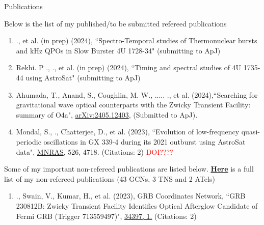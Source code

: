 \begin{section}{Publications}

    Below is the list of my published/to be submitted refereed publications
    \vspace{1em}

    \begin{enumerate}
        \item \me., et al. (in prep) (2024), {``Spectro-Temporal studies of Thermonuclear bursts and kHz QPOs in Slow Burster 4U 1728-34"} (submitting to ApJ)
        \vspace{-0.2em}

        \item Rekhi. P ., \me., et al. (in prep) (2024), {``Timing and spectral studies of 4U 1735-44 using AstroSat"} (submitting to ApJ)
        \vspace{-0.2em}

        \item Ahumada, T., Anand, S., Coughlin, M. W., ..... \me ., et al. (2024),{``Searching for gravitational wave optical counterparts with the Zwicky Transient Facility: summary of O4a"}, \href{https://arxiv.org/pdf/2405.12403}{arXiv:2405.12403}, (Submitted to ApJ).
        \vspace{-0.2em}

        \item Mondal, S., \me.,  Chatterjee, D., et al. (2023), {``Evolution of low-frequency quasi-periodic oscillations in GX 339-4 during its 2021 outburst using AstroSat data"}, \href{https://ui.adsabs.harvard.edu/link_gateway/2023MNRAS.526.4718M/doi:10.1093/mnras/stad3079}{MNRAS}, 526, 4718. (Citations: 2) {\textcolor{red}{DOI????}}
        \vspace{-0.2em}
    \end{enumerate}

    Some of my important non-refereed publications are listed below. \href{https://ui.adsabs.harvard.edu/search/filter_database_fq_database=AND&filter_database_fq_database=database%3A%22astronomy%22&filter_property_fq_property=AND&filter_property_fq_property=property%3A%22notrefereed%22&fq=%7B!type%3Daqp%20v%3D%24fq_database%7D&fq=%7B!type%3Daqp%20v%3D%24fq_property%7D&fq_database=(database%3A%22astronomy%22)&fq_property=(property%3A%22notrefereed%22)&p_=0&q=Anirudh%20Salgundi&sort=date%20desc%2C%20bibcode%20desc}{\textbf{\underline{\textcolor{navyblue}{Here}}}} is a full list of my non-refereed publications (43 GCNs, 3 TNS and 2 ATels)

    \begin{enumerate}
        \item \me., Swain, V., Kumar, H., et al. (2023), GRB Coordinates Network, {``GRB 230812B: Zwicky Transient Facility Identifies Optical Afterglow Candidate of Fermi GRB (Trigger 713559497)"}, \href{https://gcn.nasa.gov/circulars/34397}{34397, 1.} (Citations: 2) 
        \vspace{-0.2em}


\end{enumerate}
\end{section}
